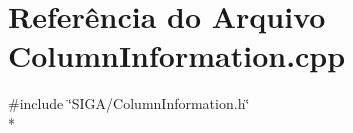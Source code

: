 \section{Referência do Arquivo Column\+Information.\+cpp}
\label{_column_information_8cpp}
{\ttfamily \#include \char`\"{}S\+I\+G\+A/\+Column\+Information.\+h\char`\"{}}\\*
